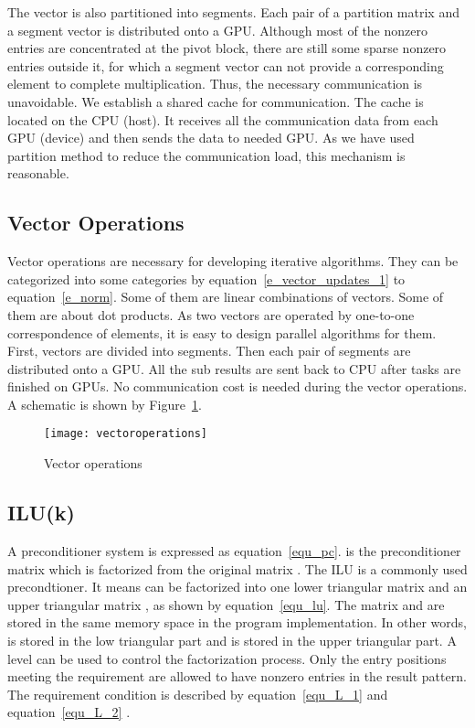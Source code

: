 \documentclass[runningheads,a4paper]{llncs}
\begin{document}
{The vector is also partitioned into segments. Each pair of a partition matrix and a segment vector is distributed onto a GPU. Although most of the nonzero entries are concentrated at the pivot block, there are still some sparse nonzero entries outside it, for which a segment vector can not provide a corresponding element to complete multiplication. Thus, the necessary communication is unavoidable. We establish a shared cache for communication. The cache is located on the CPU (host). It receives all the communication data from each GPU (device) and then sends the data to needed GPU. As we have used partition method to reduce the communication load, this mechanism is reasonable.

\subsection{Vector Operations}

Vector operations are necessary for developing iterative algorithms. They can be categorized into some categories by equation~\eqref{e_vector_updates_1} to equation~\eqref{e_norm}. Some of them are linear combinations of vectors. Some of them are about dot products. As two vectors are operated by one-to-one correspondence of elements, it is easy to design parallel algorithms for them. First, vectors are divided into segments. Then each pair of segments are distributed onto a GPU. All the sub results are sent back to CPU after tasks are finished on GPUs. No communication cost is needed during the vector operations. A schematic is shown by Figure~\ref{fig_vectoroperations}.











\begin{figure}[!tbh]
    \centering
    \texttt{[image: vectoroperations]}
    \caption{Vector operations}
    \label{fig_vectoroperations}
\end{figure}

\subsection{ILU(k)}
A preconditioner system is expressed as equation~\eqref{equ_pc}.  is the preconditioner matrix which is factorized from the original matrix . The ILU is a commonly used precondtioner. It means  can be factorized into one lower triangular matrix  and an upper triangular matrix , as shown by equation~\eqref{equ_lu}. The matrix  and  are stored in the same memory space in the program implementation. In other words,  is stored in the low triangular part and  is stored in the upper triangular part. A level  can be used to control the factorization process. Only the entry positions meeting the requirement are allowed to have nonzero entries in the result pattern. The requirement condition is described by equation~\eqref{equ_L_1} and equation~\eqref{equ_L_2} \cite{saad}.


}
\end{document}
